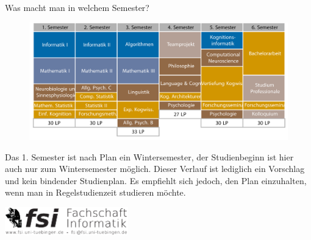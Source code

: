 	\begin{block}{Was macht man in welchem Semester?}
		\begin{figure}[h!]
			\includegraphics[width=\textwidth]{charts/kognitionswissenschaft_StudienplanabWS18.pdf}
		\end{figure}
		Das 1. Semester ist nach Plan ein Wintersemester, der Studienbeginn ist hier auch nur zum Wintersemester möglich. 
		Dieser Verlauf ist lediglich ein Vorschlag und kein bindender Studienplan. Es empfiehlt sich jedoch, den Plan einzuhalten, wenn man in Regelstudienzeit studieren möchte.
	\end{block}
\vfill
\begin{flushright}
	\includegraphics[width=0.4\textwidth]{fsilogo.pdf}
\end{flushright}